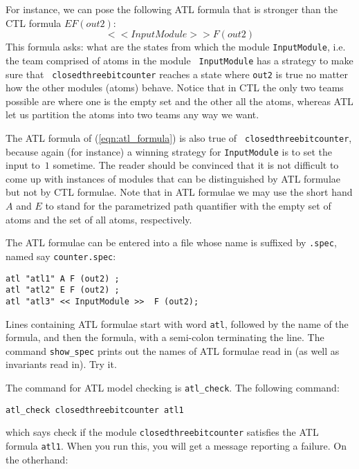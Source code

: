 For instance, we can pose the following ATL formula that is stronger than the CTL formula $E F
(out2)$:
\begin{equation}
\label{eqn:atl_formula}
 << InputModule >> F (out2) 
\end{equation}
This formula asks: what are the states from which the module
{\tt InputModule}, i.e. the team comprised of atoms in the module {\tt
InputModule} has a strategy to make sure that {\tt
closedthreebitcounter} reaches  a state where {\tt out2} is true no
matter how the other modules (atoms) behave. Notice that in CTL the
only two teams possible are where one is the empty set and the other
all the atoms, whereas ATL let us partition the atoms into two teams
any way we want. 

The ATL formula of (\ref{eqn:atl_formula}) is also true of {\tt
closedthreebitcounter}, because again (for instance) a winning strategy
for {\tt InputModule} is to set the input to~$1$ sometime.
The reader should be convinced that it is not
difficult to come up with instances of modules that can be
distinguished by ATL formulae but not by CTL formulae. 
Note that in ATL formulae we may use the short hand $A$ and $E$ to stand for
the parametrized path quantifier with the empty set of atoms and the set of all atoms, respectively.

The ATL formulae can be entered into a file whose name is suffixed
by {\tt .spec}, named say {\tt counter.spec}:

\begin{verbatim}
atl "atl1" A F (out2) ;
atl "atl2" E F (out2) ;
atl "atl3" << InputModule >>  F (out2); 
\end{verbatim}

Lines containing ATL formulae start with word {\tt atl}, followed by
the name of the formula, and then the formula, with a semi-colon
terminating the line. The command {\tt show\_spec} prints out the names
of ATL formulae read in (as well as invariants read in). Try it. 

The command for ATL model checking is {\tt atl\_check}. The following command:

\begin{verbatim}
atl_check closedthreebitcounter atl1
\end{verbatim}

\noindent
which says check if the module {\tt closedthreebitcounter} satisfies
the ATL formula {\tt atl1}. When you run this, you will get a message
reporting a failure. On the otherhand:

